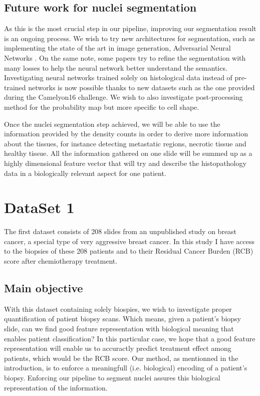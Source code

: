 \documentclass[a4paper,10pt,twocolumn]{article}
\begin{document}

\subsection{Future work for nuclei segmentation}
As this is the most crucial step in our pipeline, improving our segmentation result is an ongoing process. We wish to try new architectures for segmentation, such as implementing the state of the art in image generation, Adversarial Neural Networks \citep{goodfellow2014generative}. On the same note, some papers try to refine the segmentation with many losses to help the neural network better understand the semantics. Investigating neural networks trained solely on histological data instead of pre-trained networks is now possible thanks to new datasets such as the one provided during the Camelyon16 challenge. We wish to also investigate post-processing method for the probability map but more specific to cell shape.

Once the nuclei segmentation step achieved, we will be able to use the information provided by the 
density counts in order to derive more information about the tissues, for instance detecting metastatic 
regions, necrotic tissue and healthy tissue. All the information gathered on one slide will be summed up as a 
highly dimensional feature vector that will try and describe the histopathology data in a biologically 
relevant aspect for one patient.

\section{DataSet 1}

The first dataset consists of 208 slides from an unpublished study on breast
cancer, a special type of very aggressive breast cancer. In this study I have access to the biopsies of these 208 patients and to their Residual Cancer Burden (RCB) score after chemiotherapy treatment. 

\subsection{Main objective}
With this dataset containing solely biospies, we wish to 
investigate proper quantification of patient biopsy scans. Which 
means, given a patient's biopsy slide, can we find good feature 
representation with biological meaning that enables patient 
classification? In this particular case, we hope that a good 
feature representation will enable us to accuractly predict 
treatment effect among patients, which would be the RCB score. 
Our method, as mentionned in the introduction, is to enforce a 
meaningfull (i.e. biological) encoding of a patient's biopsy. 
Enforcing our pipeline to segment nuclei assures this biological 
representation of the information.
\end{document}
